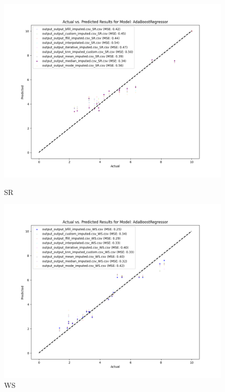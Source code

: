 \begin{figure}[H]
    \centering
    \begin{minipage}{0.495\textwidth}
        \centering
        \includegraphics[width=\linewidth]{reg_section_all/images_reg_training/SR_AdaBoostRegressor_plot.png}
        \caption{SR}
        \label{fig:sr_reg_training}
    \end{minipage}\hfill
    \begin{minipage}{0.495\textwidth}
        \centering
        \includegraphics[width=\linewidth]{reg_section_all/images_reg_training/WS_AdaBoostRegressor_plot.png}
        \caption{WS}
        \label{fig:ws_reg_training}
    \end{minipage}
\end{figure}

